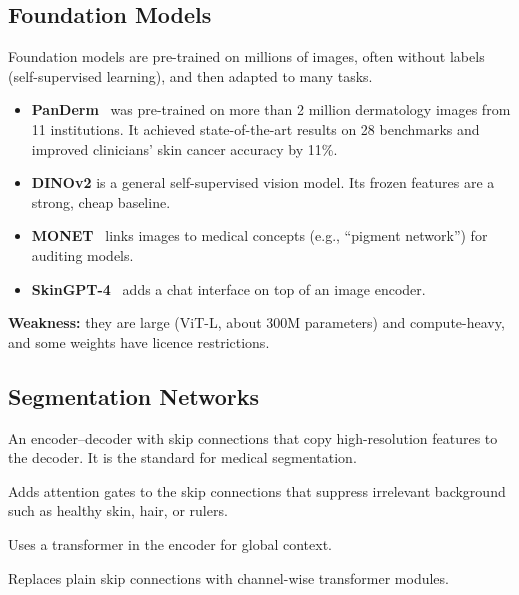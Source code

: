 \documentclass[10pt,a4paper]{article}
\begin{document}
\subsection{Foundation Models}
Foundation models are pre-trained on millions of images, often without
labels (self-supervised learning), and then adapted to many tasks.
\begin{itemize}
  \item \textbf{PanDerm}~\cite{yan2025panderm} was pre-trained on
        more than 2 million dermatology images from 11 institutions. It
        achieved state-of-the-art results on 28 benchmarks and improved
        clinicians' skin cancer accuracy by 11\%.
  \item \textbf{DINOv2} is a general self-supervised vision model. Its
        frozen features are a strong, cheap baseline.
  \item \textbf{MONET}~\cite{kim2024monet} links images to medical
        concepts (e.g., ``pigment network'') for auditing models.
  \item \textbf{SkinGPT-4}~\cite{zhou2024skingpt4} adds a chat interface
        on top of an image encoder.
\end{itemize}
\textbf{Weakness:} they are large (ViT-L, about 300M parameters) and
compute-heavy, and some weights have licence restrictions.

\subsection{Segmentation Networks}
\begin{description}[leftmargin=0pt,style=unboxed,itemsep=3pt]
  \item[U-Net~\cite{ronneberger2015unet}.] An encoder--decoder with skip
        connections that copy high-resolution features to the decoder.
        It is the standard for medical segmentation.
  \item[Attention U-Net~\cite{oktay2018attunet}.] Adds attention gates to
        the skip connections that suppress irrelevant background such as
        healthy skin, hair, or rulers.
  \item[TransUNet~\cite{chen2021transunet}.] Uses a transformer in the
        encoder for global context.
  \item[UCTransNet~\cite{wang2022uctransnet}.] Replaces plain skip
        connections with channel-wise transformer modules.
\end{description}
\end{document}
